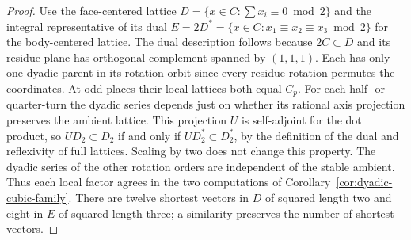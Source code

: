 \begin{proof}
Use the face-centered lattice $D=\{x\in C:\sum x_i\equiv0\bmod2\}$
and the integral representative of its dual
$E=2D^*=\{x\in C:x_1\equiv x_2\equiv x_3\bmod2\}$ for the
body-centered lattice. The dual description follows because $2C\subset
D$ and its residue plane has orthogonal complement spanned by $(1,1,1)$.
Each has only one dyadic parent in its rotation orbit since every
residue rotation permutes the coordinates. At odd places their local
lattices both equal $C_p$. For each half- or quarter-turn the dyadic series
depends just on whether its rational axis projection preserves the
ambient lattice. This projection $U$ is self-adjoint for the dot
product, so $UD_2\subset D_2$ if and only if $UD_2^*\subset D_2^*$,
by the definition of the dual and reflexivity of full lattices.
Scaling by two does not change this property. The dyadic series of the
other rotation orders are independent of the stable ambient. Thus
each local factor agrees in the two computations of
Corollary~\ref{cor:dyadic-cubic-family}. There are twelve shortest
vectors in $D$ of squared length two and eight in $E$ of squared
length three; a similarity preserves the number of shortest vectors.
\end{proof}
